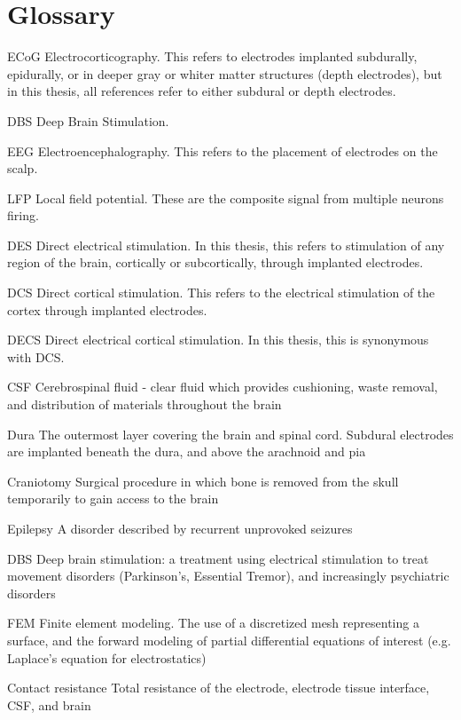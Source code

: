 \chapter*{Glossary}      %
\thispagestyle{plain}
%
\begin{glossary}
\item[ECoG] Electrocorticography. This refers to electrodes implanted subdurally, epidurally, or in deeper gray or whiter matter structures (depth electrodes), but in this thesis, all references refer to either subdural or depth electrodes. 
\item[DBS] Deep Brain Stimulation. 
\item[EEG] Electroencephalography. This refers to the placement of electrodes on the scalp. 
\item[LFP] Local field potential. These are the composite signal from multiple neurons firing.
\item[DES] Direct electrical stimulation. In this thesis, this refers to stimulation of any region of the brain, cortically or subcortically, through implanted electrodes.
\item[DCS] Direct cortical stimulation. This refers to the electrical stimulation of the cortex through implanted electrodes. 
\item[DECS] Direct electrical cortical stimulation. In this thesis, this is synonymous with DCS.
\item[CSF] Cerebrospinal fluid - clear fluid which provides cushioning, waste removal, and distribution of materials throughout the brain
\item[Dura] The outermost layer covering the brain and spinal cord. Subdural electrodes are implanted beneath the dura, and above the arachnoid and pia
\item[Craniotomy] Surgical procedure in which bone is removed from the skull temporarily to gain access to the brain
\item[Epilepsy] A disorder described by recurrent unprovoked seizures
\item[DBS] Deep brain stimulation: a treatment using electrical stimulation to treat movement disorders (Parkinson's, Essential Tremor), and increasingly psychiatric disorders
\item[FEM] Finite element modeling. The use of a discretized mesh representing a surface, and the forward modeling of partial differential equations of interest (e.g. Laplace’s equation for electrostatics)
\item[Contact resistance] Total resistance of the electrode, electrode tissue interface, CSF, and brain 

\end{glossary}
